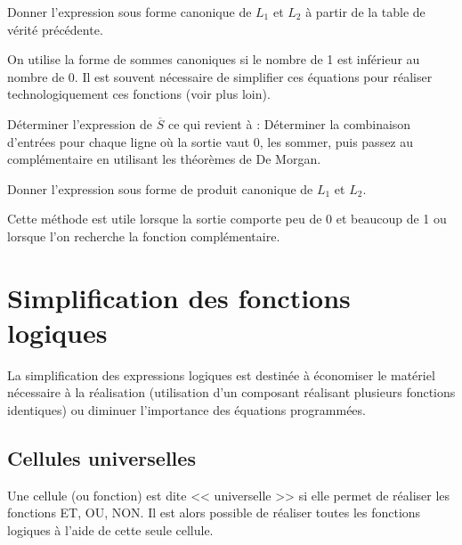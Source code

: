 \begin{exemple}
Donner l'expression sous forme canonique de $L_1$ et $L_2$ à partir de la table de vérité précédente. 
\end{exemple}

\begin{rem}
On utilise la forme de sommes canoniques si le nombre de 1 est inférieur au nombre de 0. Il est souvent nécessaire de simplifier ces équations pour réaliser technologiquement ces fonctions (voir plus loin).
\end{rem}

\begin{methode}

Déterminer l'expression de $\overline{S}$ ce qui revient à :
Déterminer la combinaison d'entrées pour chaque ligne où la sortie vaut 0, les sommer, puis passez au complémentaire en utilisant les théorèmes de De Morgan. 
\end{methode}

\begin{exemple}
Donner l'expression sous forme de produit canonique de $L_1$ et $L_2$.
\end{exemple}

\begin{rem}
Cette méthode est utile lorsque la sortie comporte peu de 0 et beaucoup de 1 ou lorsque l'on recherche la fonction complémentaire. 
\end{rem}

\section{Simplification des fonctions logiques}
La simplification des expressions logiques est destinée à économiser le matériel nécessaire à la réalisation (utilisation d'un composant réalisant plusieurs fonctions identiques) ou diminuer l'importance des équations programmées.

\subsection{Cellules universelles}
\begin{defi}
Une cellule (ou fonction) est dite << universelle >> si elle permet de réaliser les fonctions ET, OU, NON. Il est alors possible de réaliser toutes les fonctions logiques à l'aide de cette seule cellule. 
\end{defi}

